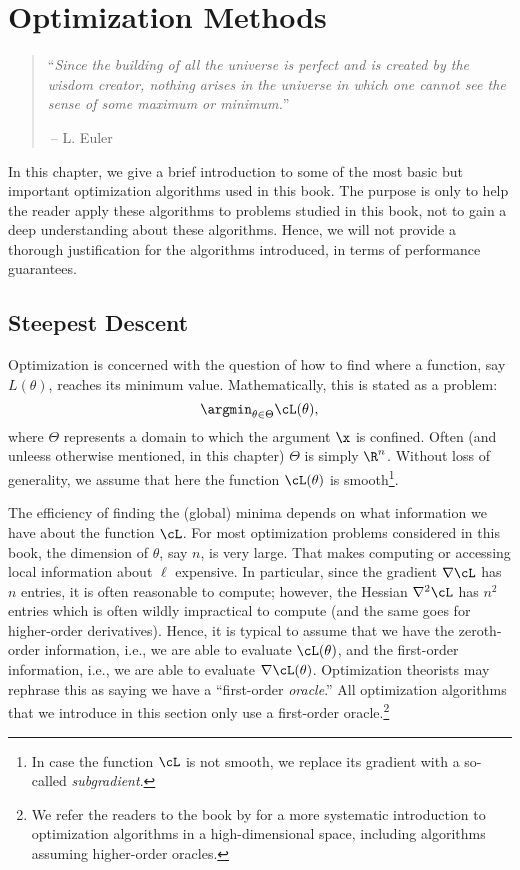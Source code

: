 \documentclass[../../book-main.tex]{subfiles}
\begin{document}
\chapter{Optimization Methods}
\label{app:optimization}

\begin{quote}
``{\em Since the building of all the universe is perfect and is created by the wisdom creator, nothing arises in the universe in which one cannot see the sense of some maximum or minimum.}''

$~$\hfill -- L. Euler
 \end{quote}
\vspace{5mm}

In this chapter, we give a brief introduction to some of the most basic but important optimization algorithms used in this book. The purpose is only to help the reader apply these algorithms to problems studied in this book, not to gain a deep understanding about these algorithms. Hence, we will not provide a thorough justification for the algorithms introduced, in terms of  performance guarantees. 

\section{Steepest Descent}


Optimization is concerned with the question of how to find where a function, say $L(\theta)$, reaches its minimum value. Mathematically, this is stated as a problem:
\begin{equation}
    \argmin_{\theta \in \Theta} \cL(\theta),
\end{equation}
where $\Theta$ represents a domain to which the argument $\x$ is confined. Often (and unleess otherwise mentioned, in this chapter) $\Theta$ is simply $\R^n$. Without loss of generality, we assume that here the function $\cL(\theta)$ is smooth\footnote{In case the function \(\cL\) is not smooth, we replace its gradient with a so-called \textit{subgradient}.}. 

The efficiency of finding the (global) minima depends on what information we have about the function \(\cL\). For most optimization problems considered in this book, the dimension of \(\theta\), say \(n\), is very large. That makes computing or accessing local information about \(\ell\) expensive. In particular, since the gradient \(\nabla \cL\) has \(n\) entries, it is often reasonable to compute; however, the Hessian \(\nabla^{2} \cL\) has \(n^{2}\) entries which is often wildly impractical to compute (and the same goes for higher-order derivatives). Hence, it is typical to assume that we have the zeroth-order information, i.e., we are able to evaluate \(\cL(\theta)\), and the first-order information, i.e., we are able to evaluate \(\nabla \cL(\theta)\). Optimization theorists may rephrase this as saying we have a ``first-order \textit{oracle}.'' All optimization algorithms that we introduce in this section only use a first-order oracle.\footnote{We refer the readers to the book by \cite{Wright-Ma-2022} for a more systematic introduction to optimization algorithms in a high-dimensional space, including algorithms assuming higher-order oracles.}  
\end{document}
